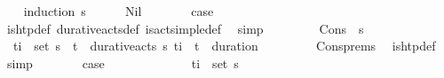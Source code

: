 \begin{isabellebody}
%
\isadelimproof
\ \ %
\endisadelimproof
%
\isatagproof
{}\isamarkupfalse%
\ {\isacharparenleft}{\kern0pt}induction\ {\isasympi}s{\isacharparenright}{\kern0pt}\isanewline
\ \ \ \ \isamarkupfalse%
\ Nil\isanewline
\ \ \ \ \isamarkupfalse%
\ \isamarkupfalse%
\ {\isacharquery}{\kern0pt}case\ \isanewline
\ \ \ \ \ \ \isamarkupfalse%
\ is{\isacharunderscore}{\kern0pt}htp{\isacharunderscore}{\kern0pt}def\ durative{\isacharunderscore}{\kern0pt}acts{\isacharunderscore}{\kern0pt}def\ is{\isacharunderscore}{\kern0pt}act{\isacharunderscore}{\kern0pt}simple{\isacharunderscore}{\kern0pt}def\ \isamarkupfalse%
\ simp\isanewline
\ \ \isamarkupfalse%
\isanewline
\ \ \ \ \isamarkupfalse%
\ {\isacharparenleft}{\kern0pt}Cons\ {\isasympi}\ {\isasympi}s{\isacharparenright}{\kern0pt}\isanewline
\ \ \ \ \isamarkupfalse%
\ {\isachardoublequoteopen}{\isacharparenleft}{\kern0pt}{\isasymexists}{\isasympi}{\isacharprime}{\kern0pt}{\isachardot}{\kern0pt}\ {\isacharparenleft}{\kern0pt}t\isactrlsub i{\isacharcomma}{\kern0pt}{\isasympi}{\isacharprime}{\kern0pt}{\isacharparenright}{\kern0pt}\ {\isasymin}\ set\ {\isacharparenleft}{\kern0pt}{\isasympi}{\isacharhash}{\kern0pt}{\isasympi}s{\isacharparenright}{\kern0pt}{\isacharparenright}{\kern0pt}\ {\isasymor}\ {\isacharparenleft}{\kern0pt}{\isasymexists}{\isacharparenleft}{\kern0pt}t\isactrlsub {\isasympi}{\isacharcomma}{\kern0pt}{\isasympi}{\isacharprime}{\kern0pt}{\isacharparenright}{\kern0pt}\ {\isasymin}\ durative{\isacharunderscore}{\kern0pt}acts\ {\isacharparenleft}{\kern0pt}{\isasympi}{\isacharhash}{\kern0pt}{\isasympi}s{\isacharparenright}{\kern0pt}{\isachardot}{\kern0pt}\ t\isactrlsub i\ {\isacharequal}{\kern0pt}\ t\isactrlsub {\isasympi}\ {\isacharplus}{\kern0pt}\ {\isacharparenleft}{\kern0pt}duration\ {\isasympi}{\isacharprime}{\kern0pt}{\isacharparenright}{\kern0pt}{\isacharparenright}{\kern0pt}{\isachardoublequoteclose}\isanewline
\ \ \ \ \ \ \isamarkupfalse%
\ Cons{\isachardot}{\kern0pt}prems\ \isamarkupfalse%
\ is{\isacharunderscore}{\kern0pt}htp{\isacharunderscore}{\kern0pt}def\ \isamarkupfalse%
\ simp\isanewline
\ \ \ \ \isamarkupfalse%
\ \isamarkupfalse%
\ {\isacharquery}{\kern0pt}case\isanewline
\ \ \ \ \isamarkupfalse%
\isanewline
\ \ \ \ \ \ \isamarkupfalse%
\ {\isachardoublequoteopen}{\isasymexists}{\isasympi}{\isacharprime}{\kern0pt}{\isachardot}{\kern0pt}\ {\isacharparenleft}{\kern0pt}t\isactrlsub i{\isacharcomma}{\kern0pt}{\isasympi}{\isacharprime}{\kern0pt}{\isacharparenright}{\kern0pt}\ {\isasymin}\ set\ {\isacharparenleft}{\kern0pt}{\isasympi}{\isacharhash}{\kern0pt}{\isasympi}s{\isacharparenright}{\kern0pt}{\isachardoublequoteclose}\isanewline

\end{isabellebody}
